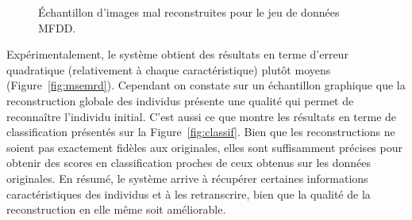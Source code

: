 \documentclass[a4paper]{article}
\begin{document}
\begin{figure}[h]
    \caption{Échantillon d'images mal reconstruites pour le jeu de données MFDD.}
\label{fig:num_reconstructed_bad}
\end{figure}



Expérimentalement, le système obtient des résultats en terme d'erreur quadratique (relativement à chaque caractéristique) plutôt moyens (Figure~\ref{fig:msemrd}). Cependant on constate sur un échantillon graphique que la reconstruction globale des individus présente une qualité qui permet de reconnaître l'individu initial. C'est aussi ce que montre les résultats en terme de classification présentés sur la Figure~\ref{fig:classif}. Bien que les reconstructions ne soient pas exactement fidèles aux originales, elles sont suffisamment précises pour obtenir des scores en classification proches de ceux obtenus sur les données originales. En résumé, le système arrive à récupérer certaines informations caractéristiques des individus et à les retranscrire, bien que la qualité de la reconstruction en elle même soit améliorable.
\end{document}
